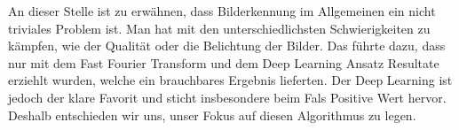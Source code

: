 An dieser Stelle ist zu erwähnen, dass Bilderkennung im Allgemeinen ein nicht triviales Problem ist. Man hat mit den unterschiedlichsten Schwierigkeiten zu kämpfen, wie der Qualität oder die Belichtung der Bilder. Das führte dazu, dass nur mit dem Fast Fourier Transform und dem Deep Learning Ansatz Resultate erziehlt wurden, welche ein brauchbares Ergebnis lieferten. Der Deep Learning ist jedoch der klare Favorit und sticht insbesondere beim Fals Positive Wert hervor. Deshalb entschieden wir uns, unser Fokus auf diesen Algorithmus zu legen. 



